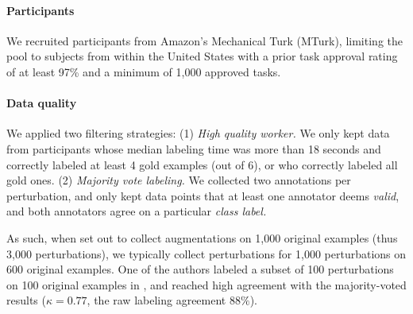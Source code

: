 \paragraph{Participants}
We recruited participants from Amazon's Mechanical Turk (MTurk), limiting the pool to subjects from within the United States with a prior task approval rating of at least 97\% and a minimum of 1,000 approved tasks.

\paragraph{Data quality}
We applied two filtering strategies: 
(1) \emph{High quality worker.} 
We only kept data from participants whose median labeling time was more than 18 seconds and correctly labeled at least 4 gold examples (out of 6), or who correctly labeled all gold ones.
(2) \emph{Majority vote labeling.}
We collected two annotations per perturbation, and only kept data points that at least one annotator deems \emph{valid}, and both annotators agree on a particular \emph{class label.}

As such, when set out to collect augmentations on 1,000 original examples (thus 3,000 perturbations), we typically collect perturbations for 1,000 perturbations on 600 original examples.
One of the authors labeled a subset of 100 perturbations on 100 original examples in \sst, and reached high agreement with the majority-voted results ($\kappa=0.77$, the raw labeling agreement $88\%$).


